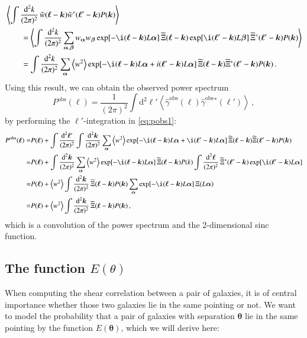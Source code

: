 \documentclass[referee]{aa} %
\renewcommand{\[}{\begin{equation}}
\renewcommand{\]}{\end{equation}}
\renewcommand{\rm}{\mathrm}
\def\b#1{\bm{#1}}
\def\la{\left<}
\def\ra{\right>}
\def\gammaoh{\hat{\gamma}^{\text{obs}}}
\def\d{\rm{d}}
\begin{document}
\begin{appendix}
\begin{align}
&\la \int \frac{\text{d}^2 k}{(2\pi)^2}\, \tilde{w}(\b \ell-\b k)\tilde{w}^*(\b \ell'-\b k)P(\b k)\ra \nonumber\\
&\qquad = \la \int \frac{\text{d}^2 k}{(2\pi)^2} \sum_{\b \alpha,\b \beta}w_{\b \alpha}w_{\b \beta} \exp[-\i(\b \ell - \b k)L\b \alpha]\, \widetilde{\Xi}(\b \ell - \b k) \exp[\i(\b \ell' - \b k)L\b \beta]\, \widetilde{\Xi}^*(\b \ell' - \b k)P(\b k)\ra \nonumber\\
&\qquad = \int \frac{\text{d}^2 k}{(2\pi)^2} \sum_{\b \alpha} \la w^2\ra \exp[-\i(\b \ell - \b k)L\b \alpha + i(\b \ell' - \b k) L\b \alpha]\, \widetilde{\Xi}(\b \ell - \b k)\widetilde{\Xi}^*(\b \ell' - \b k)P(\b k) \, .
\end{align}
Using this result, we can obtain the observed power spectrum \begin{equation}
P^{\rm{obs}}(\b\ell) = \frac{1}{(2\pi)^2}\int\d^2\ell' \la \gammaoh(\b \ell) \gammaoh {}^*(\b \ell')\ra\, ,
\end{equation}
by performing the $\b \ell'$-integration in \eqref{eq:pobs1}:
\begin{align}
P^{\text{obs}}(\b \ell) = & P(\b \ell)+\int \frac{\text{d}^2\b \ell'}{(2\pi)^2} \int\frac{\text{d}^2\b k}{(2\pi)^2}\sum_{\b \alpha}\la w^2\ra \exp[-\i(\b \ell-\b k)L\b \alpha+\i(\b \ell'-\b k)L\b \alpha]\, \widetilde{\Xi}(\b \ell-\b k)\widetilde{\Xi}(\b \ell' - \b k) P(\b k) \nonumber\\
= & P(\b \ell)+ \int\frac{\text{d}^2\b k}{(2\pi)^2}\sum_{\b \alpha}\la w^2\ra \exp[-\i(\b \ell-\b k)L\b \alpha]\, \widetilde{\Xi}(\b \ell - \b k)P(k) \int\frac{\text{d}^2\b \ell}{(2\pi)^2}\, \widetilde{\Xi}^*(\b \ell'-\b k)\exp[\i(\b \ell'- \b k)L\b \alpha] \nonumber\\
 = & P(\b \ell) + \la w^2\ra \int\frac{\text{d}^2\b k}{(2\pi)^2}\, \widetilde{\Xi}(\b \ell-\b k)P(\b k) \sum_{\b \alpha}\exp[-\i(\b \ell - \b k)L\b \alpha]\,\Xi(L\b \alpha) \nonumber\\
 = & P(\b \ell) + \la w^2\ra \int\frac{\text{d}^2\b k}{(2\pi)^2}\,\widetilde{\Xi}(\b \ell-\b k)P(\b k)\, ,
\end{align}
which is a convolution of the power spectrum and the 2-dimensional sinc function.
\label{sec:calc of PS}

\subsection{The function $E(\theta)$}
\label{sec:model_e}
When computing the shear correlation between a pair of galaxies, it is of central importance whether those two galaxies lie in the same pointing or not. We want to model the probability that a pair of galaxies with separation $\b\theta$ lie in the same pointing by the function $E(\b\theta)$, which we will derive here:


\end{appendix}
\end{document}
